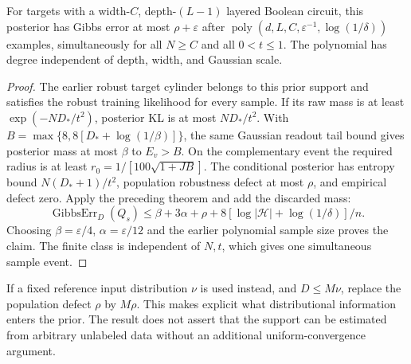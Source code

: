 \begin{corollary}
For targets with a width-$C$, depth-$(L-1)$ layered Boolean circuit, this
posterior has Gibbs error at most $\rho+\varepsilon$ after
$\operatorname{poly}(d,L,C,\varepsilon^{-1},\log(1/\delta))$ examples,
simultaneously for all $N\ge C$ and all $0<t\le1$. The polynomial has
degree independent of depth, width, and Gaussian scale.
\end{corollary}
\begin{proof}
The earlier robust target cylinder belongs to this prior support and
satisfies the robust training likelihood for every sample. If its raw
mass is at least $\exp(-ND_*/t^2)$, posterior KL is at most $ND_*/t^2$.
With $B=\max\{8,8[D_*+\log(1/\beta)]\}$, the same Gaussian readout tail
bound gives posterior mass at most $\beta$ to $E_v>B$. On the complementary
event the required radius is at least
$r_0=1/[100\sqrt{1+JB}]$. The conditional posterior has entropy bound
$N(D_*+1)/t^2$, population robustness defect at most $\rho$, and empirical
defect zero. Apply the preceding theorem and add the discarded mass:
\[
 \operatorname{GibbsErr}_D(Q_s)
 \le\beta+3\alpha+\rho
       +8[\log|\mathcal H|+\log(1/\delta)]/n.
\]
Choosing $\beta=\varepsilon/4$, $\alpha=\varepsilon/12$ and the earlier
polynomial sample size proves the claim. The finite class is independent
of $N,t$, which gives one simultaneous sample event.
\end{proof}

If a fixed reference input distribution $\nu$ is used instead, and
$D\le M\nu$, replace the population defect $\rho$ by $M\rho$. This makes
explicit what distributional information enters the prior. The result
does not assert that the support can be estimated from arbitrary unlabeled
data without an additional uniform-convergence argument.
